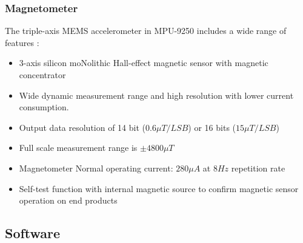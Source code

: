\subsubsection{Magnetometer}

The triple-axis MEMS accelerometer in MPU-9250 includes a wide range of features \cite{mpu9250specification}:
\begin{itemize}
  \item 3-axis silicon moNolithic Hall-effect magnetic sensor with magnetic concentrator
  \item Wide dynamic measurement range and high resolution with lower current consumption.
  \item Output data resolution of 14 bit ($0.6 \mu T/LSB$) or 16 bits ($15 \mu T/LSB$)
  \item Full scale measurement range is $\pm 4800 \mu T$
  \item Magnetometer Normal operating current: $280\mu A$ at $8 Hz$ repetition rate
  \item Self-test function with internal magnetic source to confirm magnetic sensor operation on end products
\end{itemize}

\begin{figure}[H]
  \centering
  
\end{figure}

\subsection{Software}

